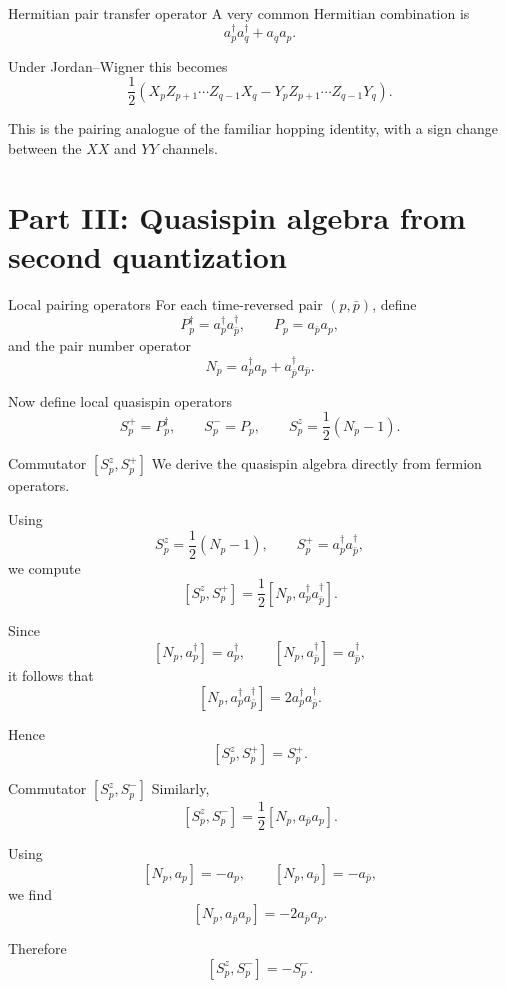 \documentclass[aspectratio=169]{beamer}
\begin{document}
\begin{frame}{Hermitian pair transfer operator}
A very common Hermitian combination is
\[
a_p^\dagger a_q^\dagger + a_q a_p.
\]

Under Jordan--Wigner this becomes
\[
\frac12
\left(
X_p Z_{p+1}\cdots Z_{q-1} X_q
-
Y_p Z_{p+1}\cdots Z_{q-1} Y_q
\right).
\]

This is the pairing analogue of the familiar hopping identity, with a sign change between the \(XX\) and \(YY\) channels.
\end{frame}

\section{Part III: Quasispin algebra from second quantization}

\begin{frame}{Local pairing operators}
For each time-reversed pair \((p,\bar p)\), define
\[
P_p^\dagger = a_p^\dagger a_{\bar p}^\dagger,
\qquad
P_p = a_{\bar p} a_p,
\]
and the pair number operator
\[
N_p = a_p^\dagger a_p + a_{\bar p}^\dagger a_{\bar p}.
\]

Now define local quasispin operators
\[
S_p^+ = P_p^\dagger,
\qquad
S_p^- = P_p,
\qquad
S_p^z = \frac12(N_p-1).
\]
\end{frame}

\begin{frame}{Commutator \([S_p^z,S_p^+]\)}
We derive the quasispin algebra directly from fermion operators.

Using
\[
S_p^z = \frac12(N_p-1),\qquad S_p^+ = a_p^\dagger a_{\bar p}^\dagger,
\]
we compute
\[
[S_p^z,S_p^+]
=
\frac12[N_p,a_p^\dagger a_{\bar p}^\dagger].
\]

Since
\[
[N_p,a_p^\dagger]=a_p^\dagger,\qquad [N_p,a_{\bar p}^\dagger]=a_{\bar p}^\dagger,
\]
it follows that
\[
[N_p,a_p^\dagger a_{\bar p}^\dagger]
=
2 a_p^\dagger a_{\bar p}^\dagger.
\]

Hence
\[
[S_p^z,S_p^+] = S_p^+.
\]
\end{frame}

\begin{frame}{Commutator \([S_p^z,S_p^-]\)}
Similarly,
\[
[S_p^z,S_p^-]
=
\frac12[N_p,a_{\bar p}a_p].
\]

Using
\[
[N_p,a_p]=-a_p,\qquad [N_p,a_{\bar p}]=-a_{\bar p},
\]
we find
\[
[N_p,a_{\bar p}a_p] = -2 a_{\bar p}a_p.
\]

Therefore
\[
[S_p^z,S_p^-] = -S_p^-.
\]
\end{frame}
\end{document}
